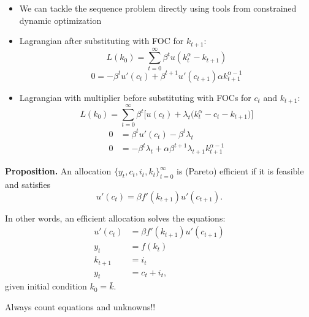 \documentclass[11pt, aspectratio=169]{beamer}
\begin{document}
\begin{frame}{}
\begin{itemize}
\item We can tackle the sequence problem directly using tools from constrained dynamic optimization

\item Lagrangian after substituting with FOC for $k_{t+1}$:
\begin{equation*}
	L(k_0) =  \sum_{t = 0}^\infty \beta^t u(k_t^\alpha  - k_{t+1})
\end{equation*}
\begin{equation*}
	0 = - \beta^t u'(c_t) + \beta^{t+1} u'(c_{t+1}) \alpha k_{t+1}^{\alpha - 1}
\end{equation*}

\item Lagrangian with multiplier before substituting with FOCs for $c_t$ and $k_{t+1}$:
\begin{equation*}
	L(k_0) =  \sum_{t = 0}^\infty \beta^t \bigg[ u(c_t) + \lambda_t \bigg( k_t^\alpha - c_t - k_{t+1} \bigg) \bigg]
\end{equation*}
\begin{align*}
	0 &= \beta^t u'(c_t) - \beta^t \lambda_t \\
	0 &= -\beta^t \lambda_t + \alpha \beta^{t+1} \lambda_{t+1} k_{t+1}^{\alpha - 1}
\end{align*}

\end{itemize}
\end{frame}



\begin{frame}{}

\textbf{Proposition.} An allocation $\{y_t, c_t, i_t, k_t\}_{t = 0}^\infty$ is (Pareto) efficient if it is feasible and satisfies   
\begin{equation*}
	u'(c_t) = \beta f'(k_{t+1}) u'(c_{t+1}).
\end{equation*}

\vspace{6mm}
In other words, an efficient allocation solves the equations:
\begin{align*}
	u'(c_t) &= \beta f'(k_{t+1}) u'(c_{t+1}) \\
	y_t &= f(k_t) \\
	k_{t+1} &= i_t \\
	y_t &= c_t + i_t,
\end{align*}
given initial condition $k_0 = \bar k$.

Always count equations and unknowns!!

\end{frame}
\end{document}
